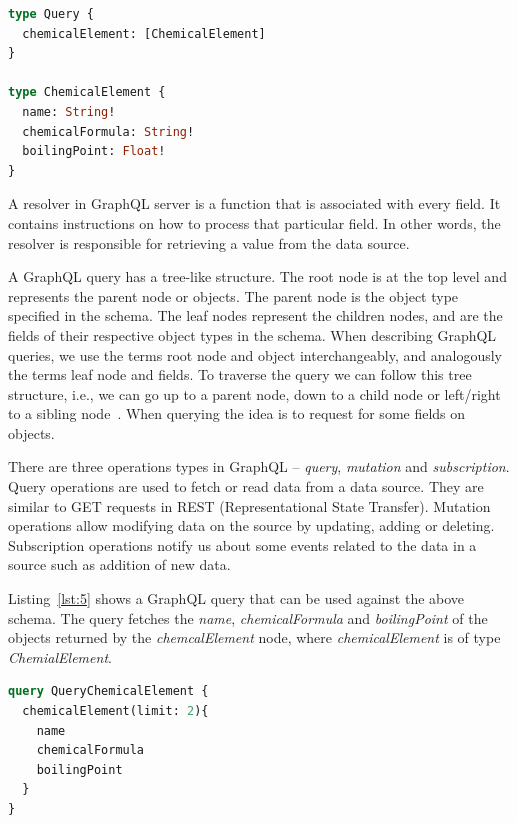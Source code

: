 \begin{minipage}{\linewidth}
\begin{lstlisting}[label=lst:4, caption={A GraphQL Schema defined to query a chemical element}, language=GraphQL]
type Query {
  chemicalElement: [ChemicalElement]
}

type ChemicalElement {
  name: String!
  chemicalFormula: String!
  boilingPoint: Float!
}
\end{lstlisting}
\end{minipage}


A resolver in GraphQL server is a function that is associated with every field. It contains instructions on how to process that particular field. In other words, the resolver is responsible for retrieving a value from the data source.
 
A GraphQL query has a tree-like structure. The root node is at the top level and represents the parent node or objects. The parent node is the object type specified in the schema. The leaf nodes represent the children nodes, and are the fields of their respective object types in the schema. When describing GraphQL queries, we use the terms root node and object interchangeably, and analogously the terms leaf node and fields. To traverse the query we can follow this tree structure, i.e., we can go up to a parent node, down to a child node or left/right to a sibling node~\cite{Perez2009}. When querying the idea is to request for some fields on objects.

There are three operations types in GraphQL – \textit{query}, \textit{mutation} and \textit{subscription}. Query operations are used to fetch or read data from a data source. They are similar to GET requests in REST (Representational State Transfer). Mutation operations allow modifying data on the source by updating, adding or deleting. Subscription operations notify us about some events related to the data in a source such as addition of new data.

Listing~\ref{lst:5} shows a GraphQL query that can be used against the above schema. The query fetches the \textit{name}, \textit{chemicalFormula} and \textit{boilingPoint} of the objects returned by  the \textit{chemcalElement} node, where \textit{chemicalElement} is of type \textit{ChemialElement}. 

\begin{minipage}{\linewidth}
\begin{lstlisting}[label=lst:5, caption={GraphQL query to fetch chemical elements and their properties}, language=GraphQL]
query QueryChemicalElement {
  chemicalElement(limit: 2){
    name
    chemicalFormula
    boilingPoint
  }
}
\end{lstlisting}
\end{minipage}


